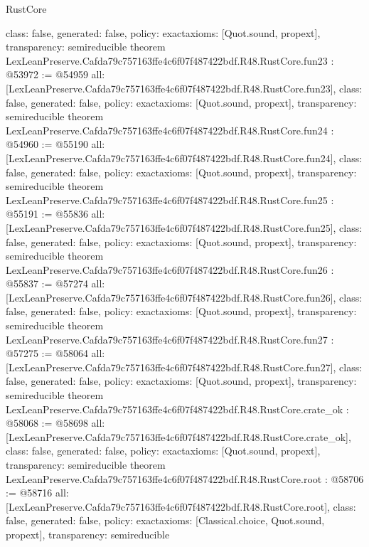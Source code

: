 \begin{lexlean}{RustCore}
\begin{coremodule}
{  class: false,
  generated: false,
  policy: exact{axioms: [Quot.sound, propext]},
  transparency: semireducible
}
theorem LexLeanPreserve.Cafda79c757163ffe4c6f07f487422bdf.R48.RustCore.fun23 : @53972 := @54959 {
  all: [LexLeanPreserve.Cafda79c757163ffe4c6f07f487422bdf.R48.RustCore.fun23],
  class: false,
  generated: false,
  policy: exact{axioms: [Quot.sound, propext]},
  transparency: semireducible
}
theorem LexLeanPreserve.Cafda79c757163ffe4c6f07f487422bdf.R48.RustCore.fun24 : @54960 := @55190 {
  all: [LexLeanPreserve.Cafda79c757163ffe4c6f07f487422bdf.R48.RustCore.fun24],
  class: false,
  generated: false,
  policy: exact{axioms: [Quot.sound, propext]},
  transparency: semireducible
}
theorem LexLeanPreserve.Cafda79c757163ffe4c6f07f487422bdf.R48.RustCore.fun25 : @55191 := @55836 {
  all: [LexLeanPreserve.Cafda79c757163ffe4c6f07f487422bdf.R48.RustCore.fun25],
  class: false,
  generated: false,
  policy: exact{axioms: [Quot.sound, propext]},
  transparency: semireducible
}
theorem LexLeanPreserve.Cafda79c757163ffe4c6f07f487422bdf.R48.RustCore.fun26 : @55837 := @57274 {
  all: [LexLeanPreserve.Cafda79c757163ffe4c6f07f487422bdf.R48.RustCore.fun26],
  class: false,
  generated: false,
  policy: exact{axioms: [Quot.sound, propext]},
  transparency: semireducible
}
theorem LexLeanPreserve.Cafda79c757163ffe4c6f07f487422bdf.R48.RustCore.fun27 : @57275 := @58064 {
  all: [LexLeanPreserve.Cafda79c757163ffe4c6f07f487422bdf.R48.RustCore.fun27],
  class: false,
  generated: false,
  policy: exact{axioms: [Quot.sound, propext]},
  transparency: semireducible
}
theorem LexLeanPreserve.Cafda79c757163ffe4c6f07f487422bdf.R48.RustCore.crate_ok : @58068 := @58698 {
  all: [LexLeanPreserve.Cafda79c757163ffe4c6f07f487422bdf.R48.RustCore.crate_ok],
  class: false,
  generated: false,
  policy: exact{axioms: [Quot.sound, propext]},
  transparency: semireducible
}
theorem LexLeanPreserve.Cafda79c757163ffe4c6f07f487422bdf.R48.RustCore.root : @58706 := @58716 {
  all: [LexLeanPreserve.Cafda79c757163ffe4c6f07f487422bdf.R48.RustCore.root],
  class: false,
  generated: false,
  policy: exact{axioms: [Classical.choice, Quot.sound, propext]},
  transparency: semireducible
}


\end{coremodule}
\end{lexlean}
